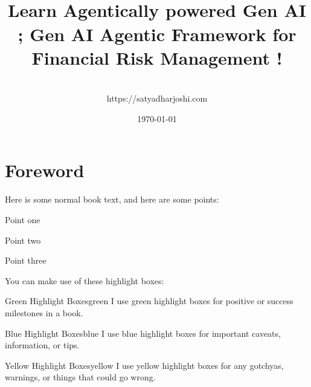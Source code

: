\documentclass[a4paper,headinclude=on,footinclude=on,12pt,oneside]{scrbook}
\begin{document}
\title{\\\small{Learn Agentically powered Gen AI ;  
		Gen AI Agentic Framework for Financial Risk Management !}}
\author{
    \\https://satyadharjoshi.com
}
\date{\today}

\maketitle
\tableofcontents

\listoffigures
{}

\listoflistings
{}

\chapter*{Foreword}


Here is some normal book text, and here are some points:

\begin{arrows}
\item Point one
\item Point two
\item Point three
\end{arrows}


You can make use of these highlight boxes:

\begin{highlightBox}{Green Highlight Boxes}{green}{\greenCheck}
I use green highlight boxes for positive or success milestones in a book.
\end{highlightBox}

\begin{highlightBox}{Blue Highlight Boxes}{blue}{\information}
I use blue highlight boxes for important caveats, information, or tips.
\end{highlightBox}

\begin{highlightBox}{Yellow Highlight Boxes}{yellow}{\warning}
I use yellow highlight boxes for any gotchyas, warnings, or things that could go wrong.
\end{highlightBox}
\end{document}
